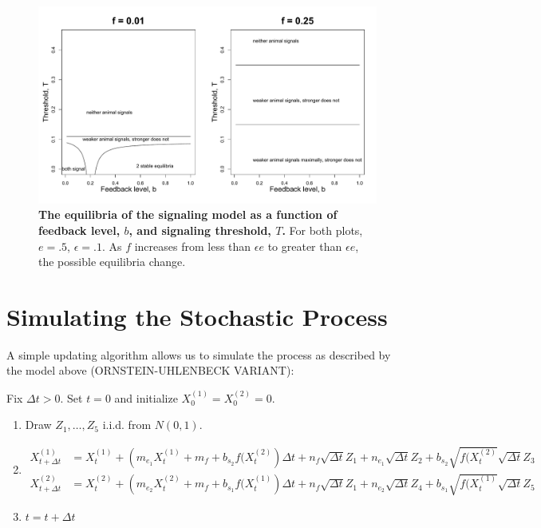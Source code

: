 \documentclass{article}
\begin{document}
\begin{figure}
\begin{center}
\includegraphics[width=1\textwidth]{bifurc_diagram.pdf}
\end{center}
\caption{{\bf The equilibria of the signaling model as a function of feedback level, $b$, and signaling threshold, $T$.} For both plots, $e=.5$, $\epsilon=.1$. As $f$ increases from less than $\epsilon e$ to greater than $\epsilon e$, the possible equilibria change.  \label{bifurcation}}
\end{figure}



\section{Simulating the Stochastic Process }
A simple updating algorithm allows us to simulate the process as described by the model above (ORNSTEIN-UHLENBECK VARIANT):

\noindent Fix $\Delta t>0$.  Set $t=0$ and initialize $X_0^{(1)}=X_0^{(2)}=0$.

\begin{enumerate}
\item Draw $Z_1,\dots,Z_5$ i.i.d. from $N(0,1)$.
\item \begin{align*}
X_{t+\Delta t}^{(1)}&=X_t^{(1)}+\left(m_{e_1}X_t^{(1)}+m_f+b_{s_2}f(X_t^{(2)}\right)\Delta t+n_f\sqrt{\Delta t}Z_1+n_{e_1}\sqrt{\Delta t}Z_2+b_{s_2}\sqrt{f(X_t^{(2)}}\sqrt{\Delta t}Z_3\\
X_{t+\Delta t}^{(2)}&=X_t^{(2)}+\left(m_{e_2}X_t^{(2)}+m_f+b_{s_1}f(X_t^{(1)}\right)\Delta t+n_f\sqrt{\Delta t}Z_1+n_{e_2}\sqrt{\Delta t}Z_4+b_{s_1}\sqrt{f(X_t^{(1)}}\sqrt{\Delta t}Z_5
\end{align*}
\item $t=t+\Delta t$


\end{enumerate}
\end{document}
